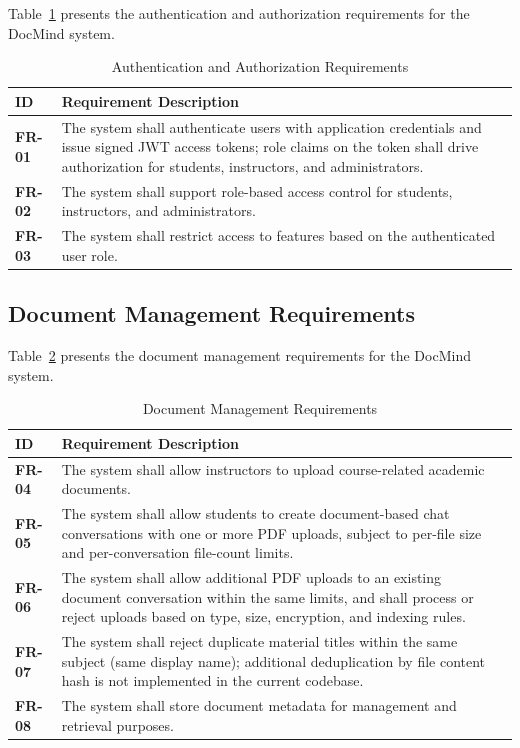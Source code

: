 \documentclass[12pt, a4paper, oneside]{report}
\let\oldsubsection\subsection
\renewcommand{\subsection}{%
  \addtocontents{toc}{\protect\needspace{3\baselineskip}}%
  \oldsubsection
}
\begin{document}
Table~\ref{tab:fr_auth} presents the authentication and authorization requirements for the DocMind system.

\begin{table}[H]
\centering
\caption{Authentication and Authorization Requirements}
\label{tab:fr_auth}
\begin{tabular}{>{\bfseries}lp{10cm}}
\toprule
ID & Requirement Description \\
\midrule
FR-01 & The system shall authenticate users with application credentials and issue signed JWT access tokens; role claims on the token shall drive authorization for students, instructors, and administrators. \\
FR-02 & The system shall support role-based access control for students, instructors, and administrators. \\
FR-03 & The system shall restrict access to features based on the authenticated user role. \\
\bottomrule
\end{tabular}
\end{table}
\newpage
\subsection{Document Management Requirements}

Table~\ref{tab:fr_doc} presents the document management requirements for the DocMind system.

\begin{table}[H]
\centering
\caption{Document Management Requirements}
\label{tab:fr_doc}
\begin{tabular}{>{\bfseries}lp{10cm}}
\toprule
ID & Requirement Description \\
\midrule
FR-04 & The system shall allow instructors to upload course-related academic documents. \\
FR-05 & The system shall allow students to create document-based chat conversations with one or more PDF uploads, subject to per-file size and per-conversation file-count limits. \\
FR-06 & The system shall allow additional PDF uploads to an existing document conversation within the same limits, and shall process or reject uploads based on type, size, encryption, and indexing rules. \\
FR-07 & The system shall reject duplicate material titles within the same subject (same display name); additional deduplication by file content hash is not implemented in the current codebase. \\
FR-08 & The system shall store document metadata for management and retrieval purposes. \\
\bottomrule
\end{tabular}
\end{table}
\newpage
\end{document}
